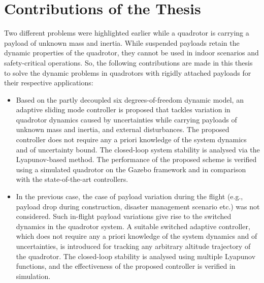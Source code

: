 




\section{Contributions of the Thesis}
Two different problems were highlighted earlier while a quadrotor is carrying a payload of unknown mass and inertia. While suspended payloads retain the dynamic properties of the quadrotor, they cannot be used in indoor scenarios and safety-critical operations. So, the following contributions are made in this thesis to solve the dynamic problems in quadrotors with rigidly attached payloads for their respective applications:
\begin{itemize}
    \item Based on the partly decoupled six degrees-of-freedom dynamic model, an adaptive sliding mode controller is proposed that tackles variation in quadrotor dynamics caused by uncertainties while carrying payloads of unknown mass and inertia, and external disturbances. The proposed controller does not require any a priori knowledge of the system dynamics and of uncertainty bound. The closed-loop system stability is analysed via the Lyapunov-based method. The performance of the proposed scheme is verified using a simulated quadrotor on the Gazebo framework and in comparison with the state-of-the-art controllers.
    \item In the previous case, the case of payload variation during the flight (e.g., payload drop during construction, disaster management scenario etc.) was not considered. Such in-flight payload variations give rise to the switched dynamics in the quadrotor system. A suitable switched adaptive controller, which does not require any a priori knowledge of the system dynamics and of uncertainties, is introduced for tracking any arbitrary altitude trajectory of the quadrotor. The closed-loop stability is analysed using multiple Lyapunov functions, and the effectiveness of the proposed controller is verified in simulation.
\end{itemize}


